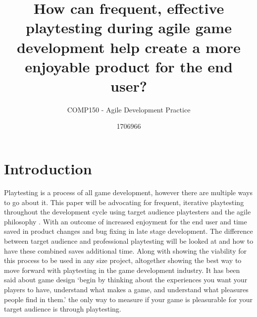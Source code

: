 \documentclass{scrartcl}
\title{How can frequent, effective playtesting during agile game development help create a more enjoyable product for the end user?}
\subtitle{COMP150 - Agile Development Practice}
\author{1706966}
\begin{document}
	
	\maketitle
	
	
	\section{Introduction}
	
	Playtesting is a process of all game development, however there are multiple ways to go about it. This paper will be advocating for frequent, iterative playtesting throughout the development cycle using target audience playtesters and the agile philosophy \cite{alliance2001agile}. With an outcome of increased enjoyment for the end user and time saved in product changes and bug fixing in late stage development. The difference between target audience and professional playtesting will be looked at and how to have these combined saves additional time. Along with showing the viability for this process to be used in any size project, altogether showing the best way to move forward with playtesting in the game development industry. It has been said about game design `begin by thinking about the experiences you want your players to have, understand what makes a game, and understand what pleasures people find in them.' \cite[p.33]{costikyan2005have} the only way to measure if your game is pleasurable for your target audience is through playtesting.
	
\end{document}
